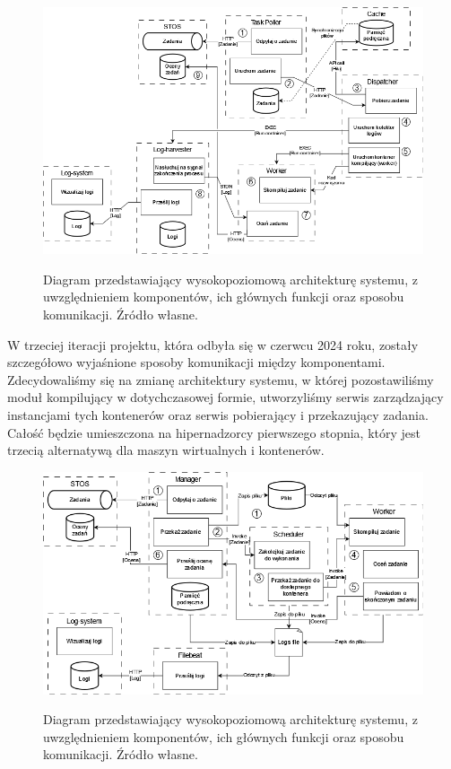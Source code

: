 \begin{figure}[!h]
	\begin{center}
		\resizebox{0.7\textwidth}{!} {
			\includegraphics{img/1/i2_arch.png}
		}
		\caption[Architektura po drugiej iteracji]{Diagram przedstawiający wysokopoziomową architekturę systemu, z uwzględnieniem komponentów, ich głównych funkcji oraz sposobu komunikacji. Źródło własne.}
	\end{center}
\end{figure}
\indent W trzeciej iteracji projektu, która odbyła się w czerwcu 2024 roku, zostały szczegółowo wyjaśnione sposoby komunikacji między komponentami. Zdecydowaliśmy się na zmianę architektury systemu, w której pozostawiliśmy moduł kompilujący w dotychczasowej formie, utworzyliśmy serwis zarządzający instancjami tych kontenerów oraz serwis pobierający i przekazujący zadania. Całość będzie umieszczona na hipernadzorcy pierwszego stopnia, który jest trzecią alternatywą dla maszyn wirtualnych i kontenerów.
\begin{figure}[!h]
	\begin{center}
		\resizebox{0.7\textwidth}{!} {
			\includegraphics{img/1/i3_arch.png}
		}
		\caption[Architektura po trzeciej iteracji]{Diagram przedstawiający wysokopoziomową architekturę systemu, z uwzględnieniem komponentów, ich głównych funkcji oraz sposobu komunikacji. Źródło własne.}
	\end{center}
\end{figure}
